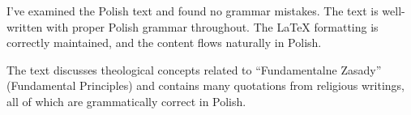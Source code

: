 I've examined the Polish text and found no grammar mistakes. The text is well-written with proper Polish grammar throughout. The LaTeX formatting is correctly maintained, and the content flows naturally in Polish.

The text discusses theological concepts related to “Fundamentalne Zasady” (Fundamental Principles) and contains many quotations from religious writings, all of which are grammatically correct in Polish.